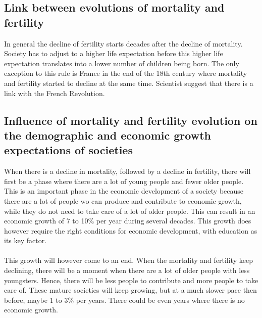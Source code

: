 \documentclass[../summary.tex]{subfiles}
\begin{document}
	\subsection{Link between evolutions of mortality and fertility}
	In general the decline of fertility starts decades after the decline of mortality. Society has to adjust to a higher life expectation before this higher life expectation translates into a lower number of children being born. The only exception to this rule is France in the end of the 18th century where mortality and fertility started to decline at the same time. Scientist suggest that there is a link with the French Revolution. 
	
	\subsection{Influence of mortality and fertility evolution on the demographic and economic growth expectations of societies}
	When there is a decline in mortality, followed by a decline in fertility, there will first be a phase where there are a lot of young people and fewer older people. This is an important phase in the economic development of a society because there are a lot of people wo can produce and contribute to economic growth, while they do not need to take care of a lot of older people. This can result in an economic growth of 7 to 10\% per year during several decades. This growth does however require the right conditions for economic development, with education as its key factor.
	\\
	\\
	This growth will however come to an end. When the mortality and fertility keep declining, there will be a moment when there are a lot of older people with less youngsters. Hence, there will be less people to contribute and more people to take care of. These mature societies will keep growing, but at a much slower pace then before, maybe 1 to 3\% per years. There could be even years where there is no economic growth.
	
\end{document}
